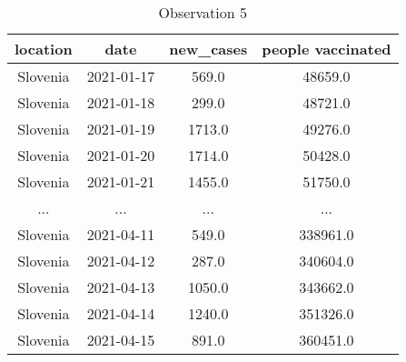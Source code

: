 \documentclass[a4 paper]{article}
\newcommand{\0}{\mathbf{0}}
\begin{document}
\begin{itemize}
    \begin{table}[!ht]
    \centering
    \caption{Observation 5}
    \label{tab:Ob5}
    \begin{tabular}{|c|c|c|c|}
    \hline
        location & date         &   new_cases         &  people vaccinated \\\hline
        Slovenia  & 2021-01-17       & 569.0          &  48659.0\\\hline
        Slovenia  & 2021-01-18       & 299.0          &  48721.0\\\hline
        Slovenia  & 2021-01-19      & 1713.0          &  49276.0\\\hline
        Slovenia  & 2021-01-20      & 1714.0          &  50428.0\\\hline
        Slovenia  & 2021-01-21      & 1455.0          &  51750.0\\\hline
        ...&...&...&...\\\hline
        Slovenia  & 2021-04-11       & 549.0          & 338961.0\\\hline
        Slovenia  & 2021-04-12       & 287.0          & 340604.0\\\hline
        Slovenia  & 2021-04-13      & 1050.0          & 343662.0\\\hline
        Slovenia  & 2021-04-14      & 1240.0          & 351326.0\\\hline
        Slovenia  & 2021-04-15       & 891.0          & 360451.0\\\hline
    \end{tabular}
    \end{table}
    

\end{itemize}
\end{document}
